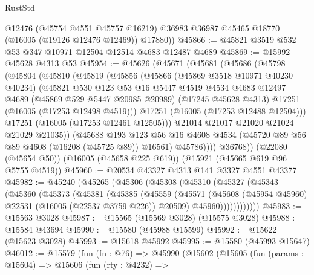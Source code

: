 \begin{lexlean}{RustStd}
\begin{coremodule}
        @12476
        (@45754 @4551 @45757 @16219)
        @36983
        @36987
        @45465
        @18770
        (@16005 (@19126 @12476 @12469))
        @17880))
@45866 := @45821 @3519 @532 @53 @347 @10971 @12504 @12514 @4683 @12487 @4689
@45869 := @15992 @45628 @4313 @53
@45954 := @45626
    (@45671
      (@45681
        (@45686
          (@45798
            (@45804
              (@45810
                (@45819
                  (@45856
                    (@45866
                      (@45869 @3518 @10971 @40230 @40234)
                      (@45821
                        @530
                        @123
                        @53
                        @16
                        @5447
                        @4519
                        @4534
                        @4683
                        @12497
                        @4689
                        (@45869 @529 @5447 @20985 @20989)
                        (@17245 @45628 @4313)
                        @17251
                        (@16005 (@17253 @12498 @4519)))
                      @17251
                      (@16005 (@17253 @12488 @12504)))
                    @17251
                    (@16005 (@17253 @12461 @12505)))
                  @21014
                  @21017
                  @21020
                  @21024
                  @21029
                  @21035))
              (@45688
                @193
                @123
                @56
                @16
                @4608
                @4534
                (@45720 @89 @56 @89 @4608 (@16208 (@45725 @89)) @16561)
                @45786))))
        @36768))
    (@22080 (@45654 @50))
    (@16005 (@45658 @225 @619))
    (@15921 (@45665 @619 @96 @5755 @4519))
@45960 := @20534 @43327 @4313 @141 @3327 @4551 @43377
@45982 := @45240
    (@45265
      (@45306
        (@45308
          (@45310
            (@45327
              (@45343
                (@45360
                  (@45373
                    (@45381
                      (@45385
                        (@45559
                          (@45571
                            (@45608 (@45954 @45960) @22531 (@16005 (@22537 @3759 @226)) @20509)
                            @45960))))))))))))
@45983 := @15563 @3028
@45987 := @15565 (@15569 @3028) (@15575 @3028)
@45988 := @15584 @43694
@45990 := @15580 (@45988 @15599)
@45992 := @15622 (@15623 @3028)
@45993 := @15618 @45992
@45995 := @15580 (@45993 @15647)
@46012 := @15579
    (fun (fn : @76) =>
    @45990
      (@15602
        (@15605
          (fun (params : @15604) =>
          @15606
            (fun (rty : @4232) =>

\end{coremodule}
\end{lexlean}

